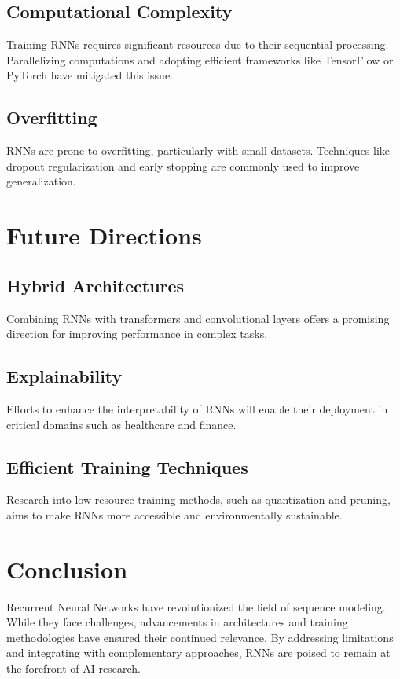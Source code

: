 \subsection{Computational Complexity}
Training RNNs requires significant resources due to their sequential processing. Parallelizing computations and adopting efficient frameworks like TensorFlow or PyTorch have mitigated this issue.

\subsection{Overfitting}
RNNs are prone to overfitting, particularly with small datasets. Techniques like dropout regularization and early stopping are commonly used to improve generalization.

\section{Future Directions}
\subsection{Hybrid Architectures}
Combining RNNs with transformers and convolutional layers offers a promising direction for improving performance in complex tasks.

\subsection{Explainability}
Efforts to enhance the interpretability of RNNs will enable their deployment in critical domains such as healthcare and finance.

\subsection{Efficient Training Techniques}
Research into low-resource training methods, such as quantization and pruning, aims to make RNNs more accessible and environmentally sustainable.

\section{Conclusion}
Recurrent Neural Networks have revolutionized the field of sequence modeling. While they face challenges, advancements in architectures and training methodologies have ensured their continued relevance. By addressing limitations and integrating with complementary approaches, RNNs are poised to remain at the forefront of AI research.


